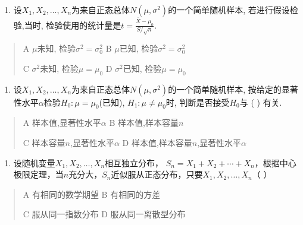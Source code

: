 \documentclass[fontset=exam]{exam-zh}
\begin{document}
\begin{enumerate}
\def\labelenumi{\arabic{enumi}.}
\setcounter{enumi}{3}
\item
  设\(X_1,X_2,\ldots,X_n\)为来自正态总体\(N(\mu,\sigma^2)\)的一个简单随机样本, 若进行假设检验,当\underline{\hspace{2cm}}时, 检验使用的统计量是\(t=\frac{\overline X-\mu_0}{S/\sqrt n}\).
\end{enumerate}

\begin{quote}
A \(\mu\)未知, 检验\(\sigma^2=\sigma_0^2\) B \(\mu\)已知, 检验\(\sigma^2=\sigma_0^2\)

C \(\sigma^2\)未知, 检验\(\mu=\mu_0\) D \(\sigma^2\)已知, 检验\(\mu=\mu_0\)
\end{quote}

\begin{enumerate}
\def\labelenumi{\arabic{enumi}.}
\setcounter{enumi}{4}
\item
  设\(X_1,X_2,\ldots,X_n\)为来自正态总体\(N(\mu,\sigma^2)\)的一个简单随机样本, 按给定的显著性水平\(\alpha\)检验\(H_0:\mu=\mu_0\)(已知), \(H_1:\mu\ne\mu_0\)时, 判断是否接受\(H_0\)与 ( ) 有关.
\end{enumerate}

\begin{quote}
A 样本值,显著性水平\(\alpha\) B 样本值,样本容量\(n\)

C 样本容量\(n\),显著性水平\(\alpha\) D 样本值,样本容量\(n\),显著性水平\(\alpha\)
\end{quote}

\begin{enumerate}
\def\labelenumi{\arabic{enumi}.}
\setcounter{enumi}{5}
\item
  设随机变量\(X_1,X_2,\ldots,X_n\)相互独立分布， \(S_n=X_1+X_2+\cdots+X_n\)，根据中心极限定理，当\(n\)充分大，\(S_n\)近似服从正态分布，只要\(X_1,X_2,\ldots,X_n\)（ ）
\end{enumerate}

\begin{quote}
A 有相同的数学期望 B 有相同的方差

C 服从同一指数分布 D 服从同一离散型分布
\end{quote}


\par{}\smallskip
\end{document}
